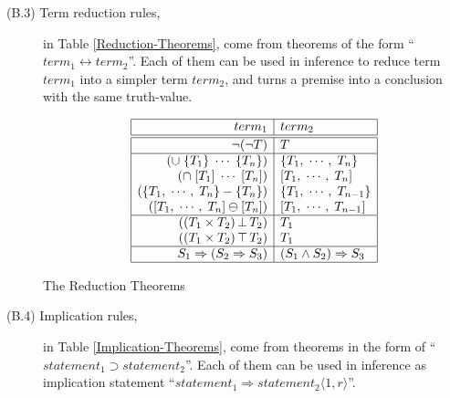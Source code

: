 \begin{description}
  \item[(B.3) Term reduction rules,] in Table \ref{Reduction-Theorems}, come from theorems of the form ``\(term_1 \leftrightarrow term_2\)''. Each of them can be used in inference to reduce term $term_1$ into a simpler term $term_2$, and turns a premise into a conclusion with the same truth-value.

\begin{table}[htb]
\[\begin{array}{|r|l|} \hline
term_1 & term_2 \\
\hline \hline
\neg (\neg T) & T \\
\hline
(\cup \; \{T_1\} \; \cdots \; \{T_n\}) & \{T_1, \; \cdots , \; T_n\} \\
(\cap \; [T_1] \; \cdots \; [T_n]) & [T_1, \; \cdots , \; T_n] \\
(\{T_1, \; \cdots , \; T_n\} - \{T_n\}) & \{T_1, \; \cdots , \; T_{n-1}\} \\
([T_1, \; \cdots , \; T_n] \ominus [T_n]) & [T_1, \; \cdots , \; T_{n-1}] \\
\hline
((T_1 \times T_2) \, \bot \, T_2) & T_1 \\
((T_1 \times T_2) \, \top \, T_2) & T_1 \\
\hline
S_1 \Rightarrow (S_2 \Rightarrow S_3) & (S_1 \wedge S_2) \Rightarrow S_3 \\
\hline \end{array}\]
\caption{The Reduction Theorems}
\label{Reduction-Theorems}
\end{table}

  \item[(B.4) Implication rules,] in Table \ref{Implication-Theorems}, come from theorems in the form of ``\(statement_1 \supset statement_2\)''. Each of them can be used in inference as implication statement ``\(statement_1 \Rightarrow statement_2 \langle 1, r\rangle \)''.


\end{description}
